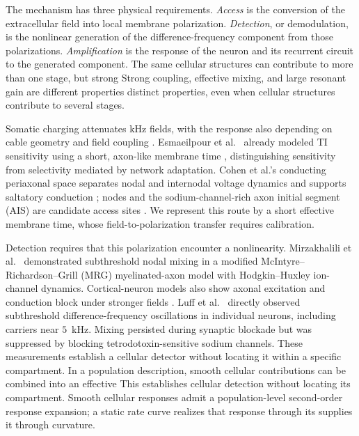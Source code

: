 \documentclass[11pt,a4paper]{article}
\providecommand{\DIFaddtex}[1]{{\protect\color{blue} \sf #1}} %
\providecommand{\DIFdeltex}[1]{{\protect\color{red} \scriptsize #1}} %
\providecommand{\DIFaddbegin}{} %
\providecommand{\DIFaddend}{} %
\providecommand{\DIFdelbegin}{} %
\providecommand{\DIFdelend}{} %
\providecommand{\DIFadd}[1]{\texorpdfstring{\DIFaddtex{#1}}{#1}} %
\providecommand{\DIFdel}[1]{\texorpdfstring{\DIFdeltex{#1}}{}} %
\begin{document}
The mechanism has three physical requirements.
\emph{Access} is the conversion of the extracellular field into local membrane
polarization. \emph{Detection}, or demodulation, is the nonlinear generation of the
difference-frequency component from those polarizations. \emph{Amplification} is
the response of the neuron and its recurrent circuit to the generated component.
\DIFdelbegin \DIFdel{The same cellular structures can contribute to more than one stage, but strong
}\DIFdelend \DIFaddbegin \DIFadd{Strong }\DIFaddend coupling, effective mixing, and \DIFdelbegin \DIFdel{large }\DIFdelend resonant gain are \DIFdelbegin \DIFdel{different properties}\DIFdelend \DIFaddbegin \DIFadd{distinct properties,
even when cellular structures contribute to several stages}\DIFaddend .

Somatic charging attenuates kHz fields, with the response also depending on cable
geometry and field coupling \cite{deitcher2017,eyal2016}. Esmaeilpour et al.\
\cite{esmaeilpour2021} already modeled TI sensitivity using a short, axon-like
membrane time\DIFaddbegin \DIFadd{, distinguishing sensitivity from selectivity mediated by
network adaptation}\DIFaddend . Cohen et al.'s conducting periaxonal space separates nodal and
internodal voltage dynamics and supports saltatory conduction
\cite{cohen2020periaxonal}; nodes and the sodium-channel-rich axon initial segment
(AIS) are candidate access sites \cite{kole2008ais}. We represent this route by a
short effective membrane time, whose field-to-polarization transfer requires
calibration.

Detection requires that this polarization encounter a nonlinearity. Mirzakhalili
et al.\ \cite{mirzakhalili2020} demonstrated subthreshold nodal mixing in a modified
McIntyre--\allowbreak Richardson--\allowbreak Grill (MRG) myelinated-axon model
with Hodgkin--Huxley ion-channel dynamics. Cortical-neuron models also
show axonal excitation and conduction block under stronger fields \cite{wang2023}.
Luff et al.\ \cite{luff2024mixer} directly observed subthreshold difference-frequency
oscillations in individual neurons, including carriers near $5$~kHz. Mixing persisted
during synaptic blockade but was suppressed by blocking tetrodotoxin-sensitive sodium
channels. \DIFdelbegin \DIFdel{These measurements establish a cellular detector without locating it
within a specific compartment. In a population description, smooth cellular contributions can be combined into an effective }\DIFdelend \DIFaddbegin \DIFadd{This establishes cellular detection without locating its compartment. Smooth
cellular responses admit a population-level }\DIFaddend second-order \DIFdelbegin \DIFdel{response}\DIFdelend \DIFaddbegin \DIFadd{expansion}\DIFaddend ; a static
rate curve \DIFdelbegin \DIFdel{realizes that response through its }\DIFdelend \DIFaddbegin \DIFadd{supplies it through }\DIFaddend curvature.
\end{document}
